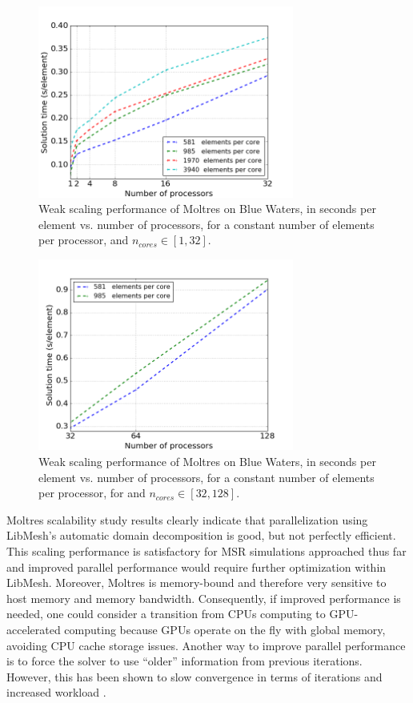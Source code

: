 \documentclass{article}
\begin{document}
\begin{figure}[htpb]
  \centering
  \includegraphics[width=0.75\textwidth]{intra-node_weak.png}
  \caption{Weak scaling performance of Moltres on Blue Waters, in seconds per element vs. number of processors, for a constant number of elements
        per processor, and $n_{cores}\in[1,32]$.}
  \label{fig:intra_weak}
\end{figure} 

\begin{figure}[htpb]
  \centering
  \includegraphics[width=0.75\textwidth]{extra-node_weak.png}
  \caption{Weak scaling performance of Moltres on Blue Waters, in seconds per element vs. number of processors, for a constant number of elements
        per processor, for and $n_{cores}\in[32,128]$.}
  \label{fig:extra_weak}
\end{figure} 

Moltres scalability study results clearly indicate that parallelization
using LibMesh's automatic domain decomposition is good, but not perfectly
efficient. This scaling performance is satisfactory for \gls{MSR} simulations 
approached thus far and improved parallel performance would require further optimization
within LibMesh.  Moreover, Moltres is memory-bound and therefore very sensitive to host memory and memory
bandwidth. Consequently, if improved performance is needed, one could consider a transition from CPUs
computing to GPU-accelerated computing because GPUs operate on the fly with 
global memory, avoiding CPU cache storage issues. Another way
to improve parallel performance is to force the solver to use
``older'' information from previous iterations. However, this has been shown to 
slow convergence in terms of iterations and increased workload \cite{satish_balay_petsc_2015}.
\end{document}
